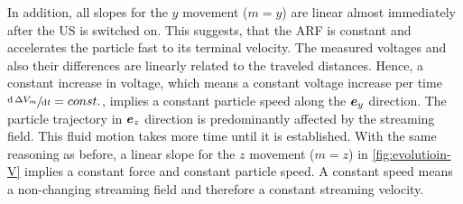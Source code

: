In addition, all slopes for the $y$ movement ($m=y$) are linear almost 
immediately after the US is
switched on. This suggests, that the ARF is constant and accelerates the 
particle fast to its terminal velocity. The measured voltages and also their 
differences are linearly related to the traveled distances. Hence, a constant 
increase in voltage, which means a constant voltage increase per time 
$\sfrac{\text{d}\,\Delta V_{m}}{\text{d}t} = const.$, implies a constant particle 
speed along the $\bm{e}_{y}$ direction. The particle trajectory in $\bm{e}_{z}$ direction is 
predominantly affected by the streaming field. This fluid motion takes more 
time until it is established. With the same reasoning as before, a linear slope 
for the $z$ movement ($m=z$) in \cref{fig:evolutioin-V} implies a constant 
force and constant particle speed. A constant speed means a non-changing 
streaming field and therefore a constant streaming velocity.

